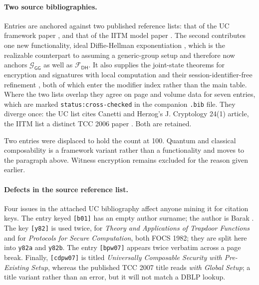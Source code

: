 \documentclass[11pt,a4paper]{article}
\newcommand{\Func}[1]{\ensuremath{\mathcal{F}_{\mathsf{#1}}}}
\newcommand{\GFunc}[1]{\ensuremath{\mathcal{G}_{\mathsf{#1}}}}
\begin{document}
\paragraph{Two source bibliographies.}
Entries are anchored against two published reference lists: that of the UC
framework paper \cite{c01,c20}, and that of the IITM model paper
\cite{kt13,k06}. The second contributes one new functionality, ideal
Diffie-Hellman exponentiation \cite{kr17}, which is the realizable counterpart
to assuming a generic-group setup and therefore now anchors \GFunc{GG} as well as
\Func{DH}. It also supplies the joint-state theorems for encryption and
signatures with local computation \cite{kt08} and their
session-identifier-free refinement \cite{kt11ccs}, both of which enter the
modifier index rather than the main table. Where the two lists overlap they
agree on page and volume data for seven entries, which are marked
\texttt{status:cross-checked} in the companion \texttt{.bib} file. They diverge
once: the UC list cites Canetti and Herzog's J. Cryptology 24(1) article, the
IITM list a distinct TCC 2006 paper \cite{ch06}. Both are retained.

Two entries were displaced to hold the count at 100. Quantum and classical
composability \cite{bm04} is a framework variant rather than a functionality and
moves to the paragraph above. Witness encryption remains excluded for the reason
given earlier.

\paragraph{Defects in the source reference list.}
Four issues in the attached UC bibliography affect anyone mining it for
citation keys. The entry keyed \texttt{[b01]} has an empty author surname; the
author is Barak \cite{barak01}. The key \texttt{[y82]} is used twice, for
\emph{Theory and Applications of Trapdoor Functions} and for \emph{Protocols
for Secure Computation}, both FOCS 1982; they are split here into
\texttt{y82a} and \texttt{y82b}. The entry \texttt{[bpw07]} appears twice
verbatim across a page break. Finally, \texttt{[cdpw07]} is titled
\emph{Universally Composable Security with Pre-Existing Setup}, whereas the
published TCC 2007 title reads \emph{with Global Setup}; a title variant
rather than an error, but it will not match a DBLP lookup.
\end{document}
